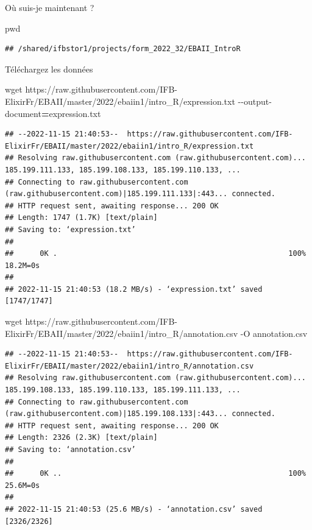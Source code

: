 \documentclass[
]{book}
\newenvironment{Shaded}{\begin{snugshade}}{\end{snugshade}}
\newcommand{\AttributeTok}[1]{\textcolor[rgb]{0.77,0.63,0.00}{#1}}
\newcommand{\BuiltInTok}[1]{#1}
\newcommand{\FunctionTok}[1]{\textcolor[rgb]{0.00,0.00,0.00}{#1}}
\newcommand{\NormalTok}[1]{#1}
\newcommand{\OperatorTok}[1]{\textcolor[rgb]{0.81,0.36,0.00}{\textbf{#1}}}
\begin{document}
Où suis-je maintenant ?

\begin{Shaded}
\begin{Highlighting}[]
\BuiltInTok{pwd}
\end{Highlighting}
\end{Shaded}

\begin{verbatim}
## /shared/ifbstor1/projects/form_2022_32/EBAII_IntroR
\end{verbatim}

Téléchargez les données

\begin{Shaded}
\begin{Highlighting}[]
\FunctionTok{wget}\NormalTok{ https://raw.githubusercontent.com/IFB{-}ElixirFr/EBAII/master/2022/ebaiin1/intro\_R/expression.txt }\AttributeTok{{-}{-}output{-}document}\OperatorTok{=}\NormalTok{expression.txt}
\end{Highlighting}
\end{Shaded}

\begin{verbatim}
## --2022-11-15 21:40:53--  https://raw.githubusercontent.com/IFB-ElixirFr/EBAII/master/2022/ebaiin1/intro_R/expression.txt
## Resolving raw.githubusercontent.com (raw.githubusercontent.com)... 185.199.111.133, 185.199.108.133, 185.199.110.133, ...
## Connecting to raw.githubusercontent.com (raw.githubusercontent.com)|185.199.111.133|:443... connected.
## HTTP request sent, awaiting response... 200 OK
## Length: 1747 (1.7K) [text/plain]
## Saving to: ‘expression.txt’
## 
##      0K .                                                     100% 18.2M=0s
## 
## 2022-11-15 21:40:53 (18.2 MB/s) - ‘expression.txt’ saved [1747/1747]
\end{verbatim}

\begin{Shaded}
\begin{Highlighting}[]
\FunctionTok{wget}\NormalTok{ https://raw.githubusercontent.com/IFB{-}ElixirFr/EBAII/master/2022/ebaiin1/intro\_R/annotation.csv }\AttributeTok{{-}O}\NormalTok{ annotation.csv}
\end{Highlighting}
\end{Shaded}

\begin{verbatim}
## --2022-11-15 21:40:53--  https://raw.githubusercontent.com/IFB-ElixirFr/EBAII/master/2022/ebaiin1/intro_R/annotation.csv
## Resolving raw.githubusercontent.com (raw.githubusercontent.com)... 185.199.108.133, 185.199.110.133, 185.199.111.133, ...
## Connecting to raw.githubusercontent.com (raw.githubusercontent.com)|185.199.108.133|:443... connected.
## HTTP request sent, awaiting response... 200 OK
## Length: 2326 (2.3K) [text/plain]
## Saving to: ‘annotation.csv’
## 
##      0K ..                                                    100% 25.6M=0s
## 
## 2022-11-15 21:40:53 (25.6 MB/s) - ‘annotation.csv’ saved [2326/2326]
\end{verbatim}
\end{document}
